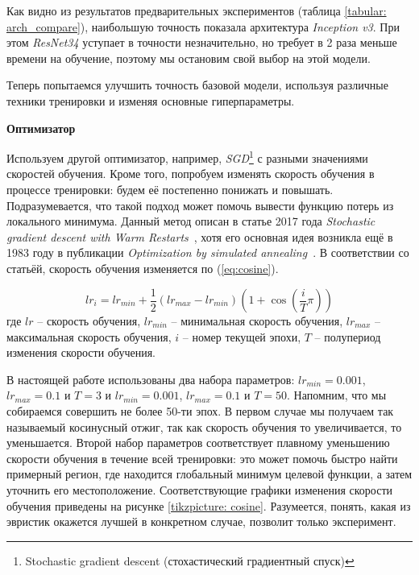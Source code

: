 \indent
\indent
Как видно из результатов предварительных экспериментов
(таблица \ref{tabular: arch_compare}), наибольшую
точность показала архитектура \textit{Inception v3}. При этом 
\textit{ResNet34} уступает в точности незначительно, но требует
в 2 раза меньше времени на обучение, поэтому мы остановим свой
выбор на этой модели. 


Теперь попытаемся улучшить точность базовой модели,
используя различные техники тренировки и изменяя основные гиперпараметры.

\indent
\indent
\textbf{Оптимизатор}

\indent
Используем другой оптимизатор, например,
\textit{SGD}\footnote{Stochastic gradient descent (стохастический 
градиентный спуск)} с 
разными значениями скоростей обучения.
Кроме того, попробуем изменять скорость обучения в процессе тренировки:
будем её постепенно понижать и повышать.
Подразумевается, что такой подход может
помочь вывести функцию потерь из локального минимума. Данный
метод описан в статье 2017 года
\textit{Stochastic gradient descent with Warm Restarts}~\cite{cosine},
хотя его основная идея возникла ещё в 1983 году в публикации
\textit{Optimization by simulated annealing}~\cite{annealing}. В соответствии со
статьёй, скорость обучения изменяется по (\ref{eq:cosine}).

\begin{equation}\label{eq:cosine}
    lr_i = lr_{min} + \frac{1}{2} (lr_{max} - lr_{min}) (1 + \cos(\frac{i}{T} \pi ))
\end{equation}
где $lr$ -- скорость обучения,
$lr_{min}$ -- минимальная скорость обучения,
$lr_{max}$ -- максимальная скорость обучения,
$i$ -- номер текущей эпохи,
$T$ -- полупериод изменения скорости обучения. 

\indent
В настоящей работе использованы два набора параметров:
$lr_{min} = 0.001$, $lr_{max} = 0.1$ и $T = 3$ и
$lr_{min} = 0.001$, $lr_{max} = 0.1$ и $T = 50$. 
Напомним, что мы собираемся совершить не более 50-ти эпох.
В первом случае мы получаем так называемый косинусный отжиг,
так как скорость обучения то увеличивается, то уменьшается.
Второй набор параметров соответствует плавному
уменьшению скорости обучения в течение всей тренировки:
это может помочь быстро найти примерный регион,
где находится глобальный
минимум целевой функции, а затем уточнить его местоположение.
Соответствующие графики изменения
скорости обучения приведены на рисунке \ref{tikzpicture: cosine}.
Разумеется, понять,
какая из эвристик окажется лучшей в конкретном случае, позволит
только эксперимент.


